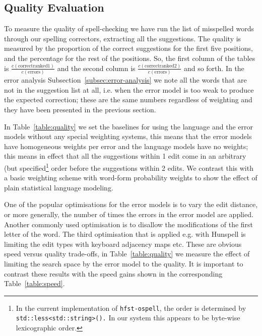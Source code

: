 \documentclass[a4paper,12pt]{article}
\begin{document}
\subsection{Quality Evaluation}

To measure the quality of spell-checking we have run the list of misspelled
words through our spelling correctors, extracting all the suggestions.  The
quality is measured by the proportion of the correct suggestions for the first
five positions, and the percentage for the rest of the positions. So, the first
column of the tables is $\frac{c(\mathrm{correct ranked
1})}{c(\mathrm{errors})}$ and the second column is $\frac{c(\mathrm{correct
ranked 2})}{c(\mathrm{errors})}$ and so forth.  In the error analysis
Subsection~\ref{subsec:error-analysis} we note all the words that are not in
the suggestion list at all, i.e. when the error model is too weak to produce
the expected correction; these are the same numbers regardless of weighting and
they have been presented in the previous section.

In Table~\ref{table:quality} we set the baselines for using the language and
the error models without any special weighting systems, this means that the
error models have homogeneous weights per error and the language models have no
weights; this means in effect that all the suggestions within 1 edit come in an
arbitrary (but specified\footnote{In the current implementation of
    \texttt{hfst-ospell}, the order is determined by
    \texttt{std::less<std::string>().} In our system this appears to be
byte-wise lexicographic order.} order before the suggestions within 2 edits.
We contrast this with a basic weighting scheme with word-form probability
weights to show the effect of plain statistical language modeling.

One of the popular optimisations for the error models is to vary the edit
distance, or more generally, the number of times the errors in the error model
are applied.  Another commonly used optimisation is to disallow the
modifications of the first letter of the word. The third optimisation that is
applied e.g.  with Hunspell is limiting the edit types with keyboard adjacency
maps etc.  These are obvious speed versus quality trade-offs, in
Table~\ref{table:quality} we measure the effect of limiting the search space by
the error model to the quality. It is important to contrast these results with
the speed gains shown in the corresponding Table~\ref{table:speed}.
\end{document}
